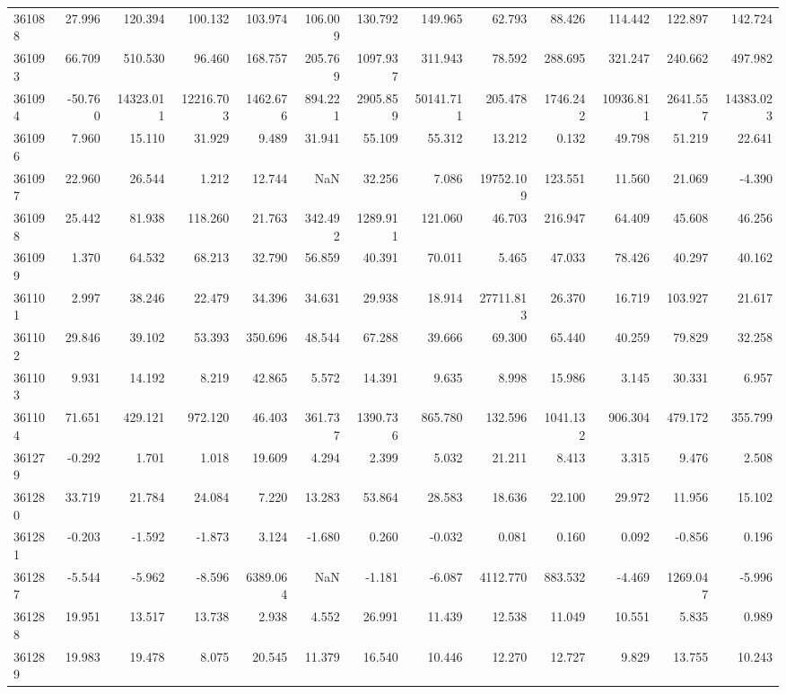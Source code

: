 \begin{tabular}{lrrrrrrrrrrrr}
361088 & 27.996 & 120.394 & 100.132 & 103.974 & 106.009 & 130.792 & 149.965 & 62.793 & 88.426 & 114.442 & 122.897 & 142.724 \\
361093 & 66.709 & 510.530 & 96.460 & 168.757 & 205.769 & 1097.937 & 311.943 & 78.592 & 288.695 & 321.247 & 240.662 & 497.982 \\
361094 & -50.760 & 14323.011 & 12216.703 & 1462.676 & 894.221 & 2905.859 & 50141.711 & 205.478 & 1746.242 & 10936.811 & 2641.557 & 14383.023 \\
361096 & 7.960 & 15.110 & 31.929 & 9.489 & 31.941 & 55.109 & 55.312 & 13.212 & 0.132 & 49.798 & 51.219 & 22.641 \\
361097 & 22.960 & 26.544 & 1.212 & 12.744 & NaN & 32.256 & 7.086 & 19752.109 & 123.551 & 11.560 & 21.069 & -4.390 \\
361098 & 25.442 & 81.938 & 118.260 & 21.763 & 342.492 & 1289.911 & 121.060 & 46.703 & 216.947 & 64.409 & 45.608 & 46.256 \\
361099 & 1.370 & 64.532 & 68.213 & 32.790 & 56.859 & 40.391 & 70.011 & 5.465 & 47.033 & 78.426 & 40.297 & 40.162 \\
361101 & 2.997 & 38.246 & 22.479 & 34.396 & 34.631 & 29.938 & 18.914 & 27711.813 & 26.370 & 16.719 & 103.927 & 21.617 \\
361102 & 29.846 & 39.102 & 53.393 & 350.696 & 48.544 & 67.288 & 39.666 & 69.300 & 65.440 & 40.259 & 79.829 & 32.258 \\
361103 & 9.931 & 14.192 & 8.219 & 42.865 & 5.572 & 14.391 & 9.635 & 8.998 & 15.986 & 3.145 & 30.331 & 6.957 \\
361104 & 71.651 & 429.121 & 972.120 & 46.403 & 361.737 & 1390.736 & 865.780 & 132.596 & 1041.132 & 906.304 & 479.172 & 355.799 \\
361279 & -0.292 & 1.701 & 1.018 & 19.609 & 4.294 & 2.399 & 5.032 & 21.211 & 8.413 & 3.315 & 9.476 & 2.508 \\
361280 & 33.719 & 21.784 & 24.084 & 7.220 & 13.283 & 53.864 & 28.583 & 18.636 & 22.100 & 29.972 & 11.956 & 15.102 \\
361281 & -0.203 & -1.592 & -1.873 & 3.124 & -1.680 & 0.260 & -0.032 & 0.081 & 0.160 & 0.092 & -0.856 & 0.196 \\
361287 & -5.544 & -5.962 & -8.596 & 6389.064 & NaN & -1.181 & -6.087 & 4112.770 & 883.532 & -4.469 & 1269.047 & -5.996 \\
361288 & 19.951 & 13.517 & 13.738 & 2.938 & 4.552 & 26.991 & 11.439 & 12.538 & 11.049 & 10.551 & 5.835 & 0.989 \\
361289 & 19.983 & 19.478 & 8.075 & 20.545 & 11.379 & 16.540 & 10.446 & 12.270 & 12.727 & 9.829 & 13.755 & 10.243 \\

\end{tabular}
